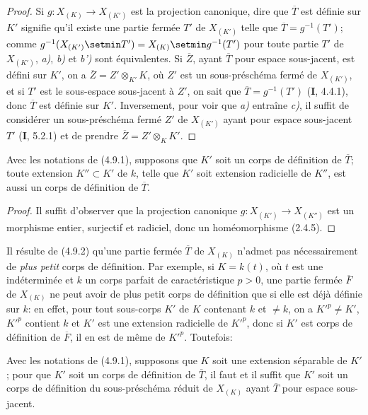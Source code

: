 \begin{proof}
Si $g:X_{(K)}\to X_{(K')}$ est la projection canonique, dire que
$\overline T$ est définie sur $K'$ signifie qu'il existe une partie fermée
$T'$ de $X_{(K')}$ telle que $\overline T=g^{-1}(T')$; comme
$g^{-1}(X_{(K')}\setmin T')=X_{(K)}\setmin g^{-1}(T')$ pour toute partie $T'$ de
$X_{(K')}$, \emph{a)}, \emph{b)} et \emph{b')} sont équivalentes. Si $\overline Z$, ayant
$\overline T$ pour espace sous-jacent, est défini sur $K'$, on a
$\overline Z=Z'\otimes_{K'}K$, où $Z'$ est un sous-préschéma fermé de
$X_{(K')}$, et si $T'$ est le sous-espace sous-jacent à $Z'$, on sait que
$\overline T=g^{-1}(T')$ (\textbf{I}, 4.4.1), donc $\overline T$ est définie sur
$K'$. Inversement, pour voir que \emph{a)} entraîne \emph{c)}, il suffit de considérer un
sous-préschéma fermé $Z'$ de $X_{(K')}$ ayant pour espace sous-jacent $T'$
(\textbf{I}, 5.2.1) et de prendre $\overline Z=Z'\otimes_KK'$.
\end{proof}

\begin{corollary}[4.9.2]
\label{IV.2.4.9.2-fr}
Avec les notations de \textup{(4.9.1)}, supposons que $K'$ soit un corps de définition
de $\overline T$; toute extension $K''\subset K'$ de $k$, telle que $K'$ soit
extension radicielle de $K''$, est aussi un corps de définition de
$\overline T$.
\end{corollary}

\begin{proof}
Il suffit d'observer que la projection canonique
$g:X_{(K')}\to X_{(K'')}$ est un morphisme entier, surjectif et radiciel,
donc un homéomorphisme (2.4.5).
\end{proof}

\begin{remark}[4.9.3]
\label{IV.2.4.9.3-fr}
Il résulte de (4.9.2) qu'une partie fermée $\overline T$ de $X_{(K)}$ n'admet
pas nécessairement de \emph{plus petit} corps de définition. Par exemple, si
$K=k(t)$, où $t$ est une indéterminée et $k$ un corps parfait de
caractéristique $p>0$, une partie fermée $\overline F$ de $X_{(K)}$ ne peut
avoir de plus petit corps de définition que si elle est déjà définie sur $k$:
en effet, pour tout sous-corps $K'$ de $K$ contenant $k$ et $\ne k$, on a
$K'^p\ne K'$, $K'^p$ contient $k$ et $K'$
est une extension radicielle de $K'^p$, donc si $K'$ est corps de définition
de $\overline F$, il en est de même de $K'^p$. Toutefois:
\end{remark}

\begin{proposition}[4.9.4]
\label{IV.2.4.9.4-fr}
Avec les notations de \textup{(4.9.1)}, supposons que $K$ soit une extension séparable
de $K'$; pour que $K'$ soit un corps de définition de $\overline T$, il faut
et il suffit que $K'$ soit un corps de définition du sous-préschéma réduit de
$X_{(K)}$ ayant $\overline T$ pour espace sous-jacent.
\end{proposition}

